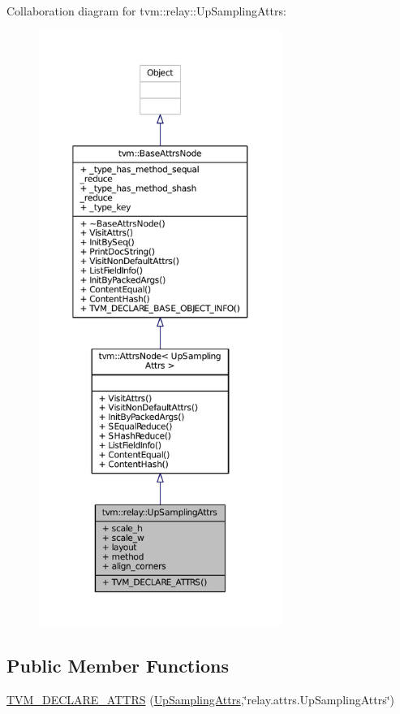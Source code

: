 Collaboration diagram for tvm\+:\+:relay\+:\+:Up\+Sampling\+Attrs\+:
\nopagebreak
\begin{figure}[H]
\begin{center}
\leavevmode
\includegraphics[height=550pt]{structtvm_1_1relay_1_1UpSamplingAttrs__coll__graph}
\end{center}
\end{figure}
\subsection*{Public Member Functions}
\begin{DoxyCompactItemize}
\item 
\hyperlink{structtvm_1_1relay_1_1UpSamplingAttrs_a72409e119bd1c1d16f51f53f4b0e1ae6}{T\+V\+M\+\_\+\+D\+E\+C\+L\+A\+R\+E\+\_\+\+A\+T\+T\+RS} (\hyperlink{structtvm_1_1relay_1_1UpSamplingAttrs}{Up\+Sampling\+Attrs},\char`\"{}relay.\+attrs.\+Up\+Sampling\+Attrs\char`\"{})
\end{DoxyCompactItemize}
